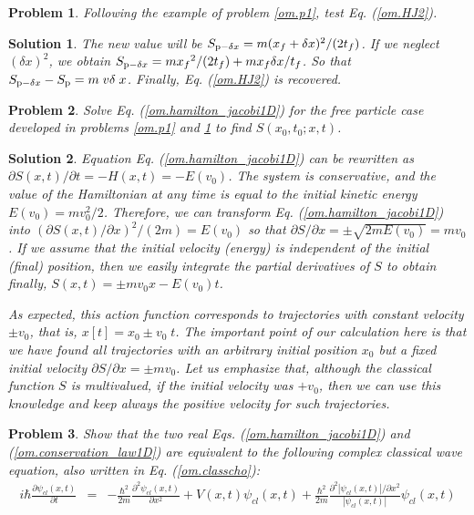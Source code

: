 \documentclass[nofootinbib, secnumarabic, amsmath, nobibnotes,10pt,aps,pra]{revtex4-1}
\newtheorem{problem}{Problem}
\newtheorem{solution}{Solution}
\newcommand{\eref}[1]{Eq. (\ref{#1})}
\begin{document}
\begin{problem} \label{om.p2}
Following the example of problem \ref{om.p1}, test \eref{om.HJ2}.
\end{problem}

\begin{solution}
The new value will be $S_{{\rm p} - \delta x} = m (x_f + \delta
x)^2/(2 t_f)$. If we neglect $(\delta x)^2$, we obtain $S_{{\rm
p} - \delta x} = m {x_f}^2/(2 t_f) + m {x_f} \delta x/t_f$. So that
$S_{{\rm p} - \delta x} - S_{\rm p} = m \; v \delta \; x$. Finally,
\eref{om.HJ2} is recovered.
\end{solution}


\begin{problem} \label{om.p3}
Solve \eref{om.hamilton_jacobi1D} for the free particle case developed in problems \ref{om.p1} and \ref{om.p2} to find $S(x_0,t_0;x,t)$.
\end{problem}

\begin{solution}
Equation \eref{om.hamilton_jacobi1D} can be rewritten as ${\partial S(x,t)}/{\partial t} = -H(x,t) = -E(v_0)$. The system is conservative, and the value of the Hamiltonian at any time is equal to the initial kinetic energy $E(v_0) = m v_0^2/2$. Therefore, we can transform \eref{om.hamilton_jacobi1D} into $(\partial S(x,t)/\partial x)^2/(2 m) = E(v_0)$ so that $\partial S/\partial x = \pm \sqrt{2 m E(v_0)} = m v_0$. If we assume that the initial velocity (energy) is independent of the initial (final) position, then we easily integrate the partial derivatives of $S$ to obtain finally, $S(x,t) = \pm m v_0 x - E(v_0) t$.

As expected, this action function corresponds to trajectories with
constant velocity $\pm v_0$, that is, $x[t] = x_0 \pm v_0 \; t$. The
important point of our calculation here is that we have found all
trajectories with an arbitrary initial position $x_0$ but a fixed
initial velocity $\partial S/\partial x = \pm m v_0$. Let us
emphasize that, although the classical function $S$ is multivalued,
if the initial velocity was $ + v_0$, then we can use this knowledge  and keep always the positive velocity for such
trajectories.
\end{solution}

\begin{problem} \label{om.p3bis}
Show that the two real Eqs. (\ref{om.hamilton_jacobi1D}) and (\ref{om.conservation_law1D}) are equivalent to the following complex classical wave equation, also written in \eref{om.classcho}:
\begin{eqnarray}
\label{om.p.classcho}
i \hbar \frac{ \partial \psi_{cl}(x,t)} {\partial t} &=& -\frac {\hbar^2}{2m} \frac{ {\partial}^2 \psi_{cl}(x,t)} {\partial x^2} + V(x,t) \psi_{cl}(x,t)+ \frac {\hbar^{2}} {2 m} \frac { {\partial}^2 |\psi_{cl}(x,t)|/ \partial x^2}{|\psi_{cl}(x,t)|} \psi_{cl}(x,t)\nonumber\\
\end{eqnarray}
\end{problem}
\end{document}
